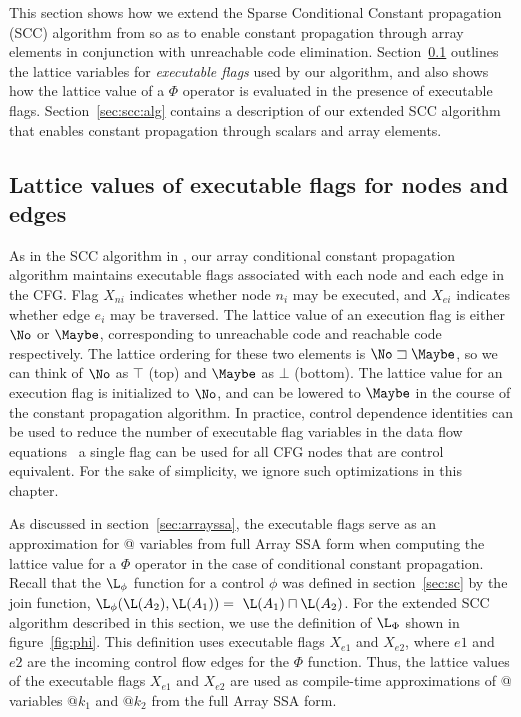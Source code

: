 This section shows how we extend the Sparse Conditional
Constant propagation (SCC) algorithm from \cite{WeZa91} so as to enable
constant propagation through array elements in conjunction with 
unreachable code elimination.
Section~\ref{sec:scc:flags} outlines the lattice variables
for {\it executable flags} used by our algorithm, and also shows
how the lattice value of a $\Phi$ operator is evaluated in the
presence of executable flags.
Section~\ref{sec:scc:alg} contains a description of our extended
SCC algorithm that enables constant propagation through scalars and
array elements.

\subsection{Lattice values of executable flags for nodes and edges}\label{sec:scc:flags}


As in the SCC algorithm in \cite{WeZa91},
our array conditional constant propagation
algorithm maintains executable flags associated with each node and
each edge in the CFG. Flag $X_{ni}$ indicates
whether node $n_i$ may be executed, and $X_{ei}$ indicates whether
edge $e_i$ may be traversed.  The lattice value of an execution
flag is either $\No$ or $\Maybe$, corresponding to
unreachable code and reachable code respectively.
The lattice ordering for these two elements is $\No \sqsupset \Maybe$,
so we can think of $\No$ as $\top$ (top) and $\Maybe$ as $\bot$ (bottom).
The lattice
value for an
execution flag is initialized to $\No$, and can be lowered to $\Maybe$
in the course of the constant propagation algorithm.
In practice, control dependence identities can be used to reduce the number of executable flag variables in the data flow equations \eg\ a single flag can be used for all CFG nodes that are control equivalent.  For the sake of
simplicity, we ignore such optimizations in this chapter.


As discussed in section~\ref{sec:arrayssa}, 
the executable flags serve as an approximation for @ variables
from full Array SSA form when computing the lattice value
for a $\Phi$ operator in the case of conditional constant propagation.
Recall that the
$\L_{\phi}$ function for a control $\phi$
was defined in section~\ref{sec:sc} by the  join function,
$\L_{\phi}(\L(A_2),\L(A_1)) =\ \L(A_1) \sqcap
\L(A_2)$.  For the extended SCC algorithm described in this section,
we use the definition of $\L_{\Phi}$ shown
in figure~\ref{fig:phi}.  This definition uses executable flags
$X_{e1}$ and $X_{e2}$, where $e1$ and $e2$ are the incoming control 
flow edges for the $\Phi$ function.  Thus, the lattice values of the
executable flags $X_{e1}$ and $X_{e2}$
are used as compile-time approximations of 
@ variables $@k_1$ and $@k_2$ from the
full Array SSA form.


